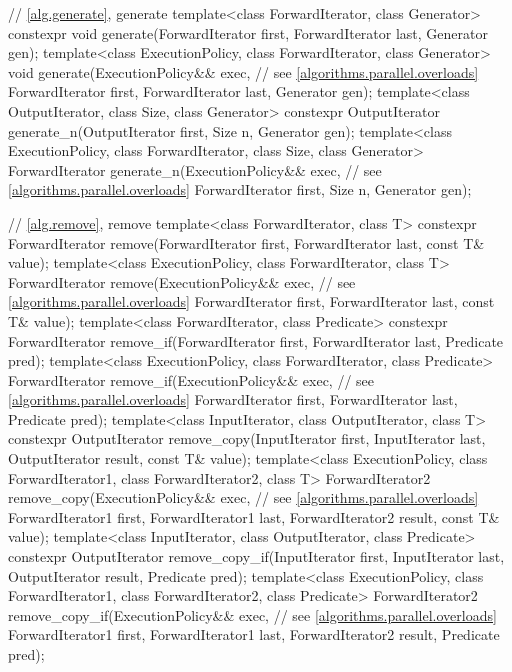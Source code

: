 \begin{codeblock}
{  // \ref{alg.generate}, generate
  template<class ForwardIterator, class Generator>
    constexpr void generate(ForwardIterator first, ForwardIterator last,
                            Generator gen);
  template<class ExecutionPolicy, class ForwardIterator, class Generator>
    void generate(ExecutionPolicy&& exec, // see \ref{algorithms.parallel.overloads}
                  ForwardIterator first, ForwardIterator last,
                  Generator gen);
  template<class OutputIterator, class Size, class Generator>
    constexpr OutputIterator generate_n(OutputIterator first, Size n, Generator gen);
  template<class ExecutionPolicy, class ForwardIterator, class Size, class Generator>
    ForwardIterator generate_n(ExecutionPolicy&& exec, // see \ref{algorithms.parallel.overloads}
                               ForwardIterator first, Size n, Generator gen);

  // \ref{alg.remove}, remove
  template<class ForwardIterator, class T>
    constexpr ForwardIterator remove(ForwardIterator first, ForwardIterator last,
                                     const T& value);
  template<class ExecutionPolicy, class ForwardIterator, class T>
    ForwardIterator remove(ExecutionPolicy&& exec, // see \ref{algorithms.parallel.overloads}
                           ForwardIterator first, ForwardIterator last,
                           const T& value);
  template<class ForwardIterator, class Predicate>
    constexpr ForwardIterator remove_if(ForwardIterator first, ForwardIterator last,
                                        Predicate pred);
  template<class ExecutionPolicy, class ForwardIterator, class Predicate>
    ForwardIterator remove_if(ExecutionPolicy&& exec, // see \ref{algorithms.parallel.overloads}
                              ForwardIterator first, ForwardIterator last,
                              Predicate pred);
  template<class InputIterator, class OutputIterator, class T>
    constexpr OutputIterator
      remove_copy(InputIterator first, InputIterator last,
                  OutputIterator result, const T& value);
  template<class ExecutionPolicy, class ForwardIterator1, class ForwardIterator2,
           class T>
    ForwardIterator2
      remove_copy(ExecutionPolicy&& exec, // see \ref{algorithms.parallel.overloads}
                  ForwardIterator1 first, ForwardIterator1 last,
                  ForwardIterator2 result, const T& value);
  template<class InputIterator, class OutputIterator, class Predicate>
    constexpr OutputIterator
      remove_copy_if(InputIterator first, InputIterator last,
                     OutputIterator result, Predicate pred);
  template<class ExecutionPolicy, class ForwardIterator1, class ForwardIterator2,
           class Predicate>
    ForwardIterator2
      remove_copy_if(ExecutionPolicy&& exec, // see \ref{algorithms.parallel.overloads}
                     ForwardIterator1 first, ForwardIterator1 last,
                     ForwardIterator2 result, Predicate pred);

}
\end{codeblock}

